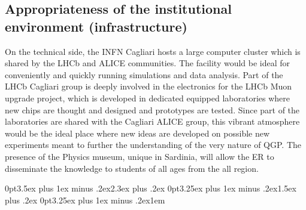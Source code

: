 \documentclass[a4paper,11pt]{article}
\newcommand{\ER}{ER\xspace}
\newcommand{\supervisor}{the supervisor\xspace}
\begin{document}
%      
%      
\subsection{Appropriateness of the institutional environment (infrastructure)}



On the technical side, the INFN Cagliari hosts a large computer cluster which
is shared by the LHCb and ALICE communities. The facility would be
ideal for conveniently and quickly running simulations and data analysis. 
Part of the LHCb Cagliari group is deeply involved in the 
electronics for the LHCb Muon upgrade project, which is 
developed in dedicated equipped laboratories where new chips 
are thought and designed and prototypes are tested. 
Since part of the laboratories are shared with the Cagliari ALICE group,
this vibrant atmosphere would be the ideal place where 
new ideas are developed on possible new experiments 
meant to further the understanding of the very nature of 
QGP. The presence of the Physics museum, unique in Sardinia, 
will allow the \ER to disseminate the knowledge to 
students of all ages from the all region.
\clearpage

\titlespacing*{\section} {0pt}{3.5ex plus 1ex minus .2ex}{2.3ex plus .2ex}
\titlespacing*{\subsection} {0pt}{3.25ex plus 1ex minus .2ex}{1.5ex plus .2ex}
\titlespacing*{\paragraph} {0pt}{3.25ex plus 1ex minus .2ex}{1em}
\end{document}
